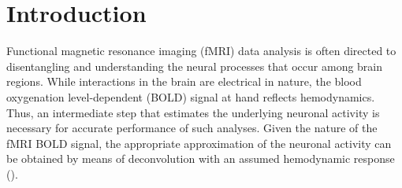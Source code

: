 \section{Introduction}








Functional magnetic resonance imaging (fMRI) data analysis is often directed to disentangling and understanding the neural processes that occur among brain regions. While interactions in the brain are electrical in nature, the blood oxygenation level-dependent (BOLD) signal at hand reflects hemodynamics. Thus, an intermediate step that estimates the underlying neuronal activity is necessary for accurate performance of such analyses. Given the nature of the fMRI BOLD signal, the appropriate approximation of the neuronal activity can be obtained by means of deconvolution with an assumed hemodynamic response (\citealt{gitelman2003ModelingRegionalPsychophysiologic}).

